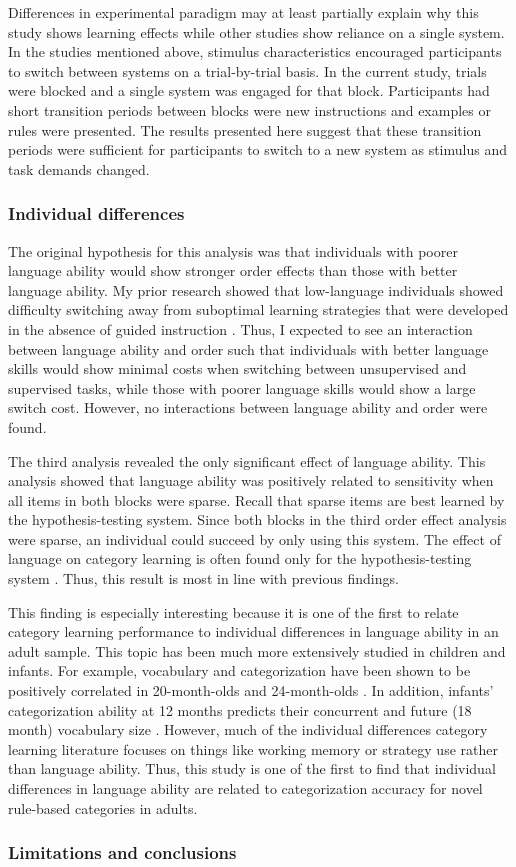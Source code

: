 \documentclass[../dissertation.tex]{subfiles}
\begin{document}
	Differences in experimental paradigm may at least partially explain why this study shows learning effects while other studies show reliance on a single system. In the studies mentioned above, stimulus characteristics encouraged participants to switch between systems on a trial-by-trial basis. In the current study, trials were blocked and a single system was engaged for that block. Participants had short transition periods between blocks were new instructions and examples or rules were presented. The results presented here suggest that these transition periods were sufficient for participants to switch to a new system as stimulus and task demands changed. 
	
\subsubsection{Individual differences}

	The original hypothesis for this analysis was that individuals with poorer language ability would show stronger order effects than those with better language ability. My prior research showed that low-language individuals showed difficulty switching away from suboptimal learning strategies that were developed in the absence of guided instruction \citep{Ryherd2019}. Thus, I expected to see an interaction between language ability and order such that individuals with better language skills would show minimal costs when switching between unsupervised and supervised tasks, while those with poorer language skills would show a large switch cost. However, no interactions between language ability and order were found. \par
	The third analysis revealed the only significant effect of language ability. This analysis showed that language ability was positively related to sensitivity when all items in both blocks were sparse. Recall that sparse items are best learned by the hypothesis-testing system. Since both blocks in the third order effect analysis were sparse, an individual could succeed by only using this system. The effect of language on category learning is often found only for the hypothesis-testing system \citep{Lupyan2009,Lupyan2013}. Thus, this result is most in line with previous findings. \par 
	This finding is especially interesting because it is one of the first to relate category learning performance to individual differences in language ability in an adult sample. This topic has been much more extensively studied in children and infants. For example, vocabulary and  categorization have been shown to be positively correlated in 20-month-olds \citep{Nazzi2001} and 24-month-olds \citep{Jaswal2007}. In addition, infants' categorization ability at 12 months predicts their concurrent and future (18 month) vocabulary size \citep{Ferguson2015}. However, much of the individual differences category learning literature focuses on things like working memory or strategy use rather than language ability. Thus, this study is one of the first to find that individual differences in language ability are related to categorization accuracy for novel rule-based categories in adults.
	
\subsubsection{Limitations and conclusions}
	
\end{document}
